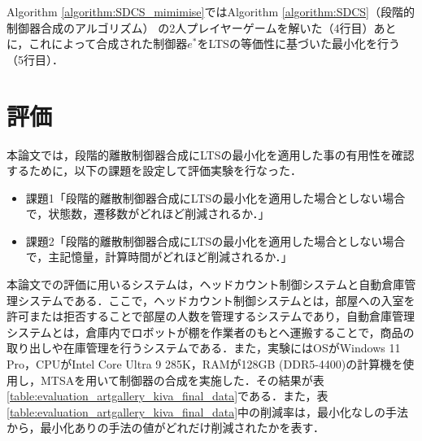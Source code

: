 \documentclass[technicalreport]{ieicej}
\begin{document}
  Algorithm \ref{algorithm:SDCS_mimimise}ではAlgorithm \ref{algorithm:SDCS}（段階的制御器合成のアルゴリズム） の2人プレイヤーゲームを解いた（4行目）あとに，これによって合成された制御器$e^*$をLTSの等価性に基づいた最小化を行う（5行目）．

\section{評価}
本論文では，段階的離散制御器合成にLTSの最小化を適用した事の有用性を確認するために，以下の課題を設定して評価実験を行なった．
\begin{itemize}
  \item 課題1「段階的離散制御器合成にLTSの最小化を適用した場合としない場合で，状態数，遷移数がどれほど削減されるか．」
  \item 課題2「段階的離散制御器合成にLTSの最小化を適用した場合としない場合で，主記憶量，計算時間がどれほど削減されるか．」
\end{itemize}

\indent
本論文での評価に用いるシステムは，ヘッドカウント制御システム\cite{ArtGallery}と自動倉庫管理システム\cite{KIVA}である．ここで，ヘッドカウント制御システムとは，部屋への入室を許可または拒否することで部屋の人数を管理するシステムであり，自動倉庫管理システムとは，倉庫内でロボットが棚を作業者のもとへ運搬することで，商品の取り出しや在庫管理を行うシステムである．また，実験にはOSがWindows 11 Pro，CPUがIntel Core Ultra 9 285K，RAMが128GB (DDR5-4400)の計算機を使用し，MTSA\cite{MTSA}を用いて制御器の合成を実施した．その結果が表\ref{table:evaluation_artgallery_kiva_final_data}である．また，表\ref{table:evaluation_artgallery_kiva_final_data}中の削減率は，最小化なしの手法から，最小化ありの手法の値がどれだけ削減されたかを表す．
\end{document}
